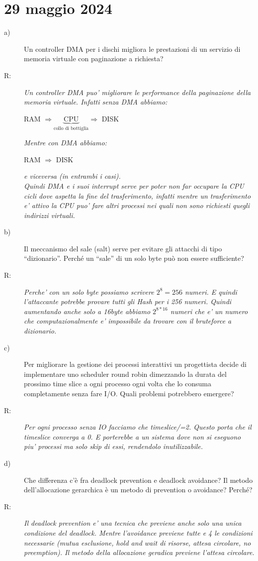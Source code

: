 \documentclass[a4paper,12pt]{article}
\newcommand{\datasection}[1]{%
    \section*{#1}%
    \addcontentsline{toc}{section}{#1}%
}
\newenvironment{exambox}{%
    \begin{mdframed}[
        linecolor=black!70,
        linewidth=0.6pt,
        innerleftmargin=8pt,
        innerrightmargin=8pt,
        innertopmargin=6pt,
        innerbottommargin=6pt
    ]
    \begin{description}
}{%
    \end{description}
    \end{mdframed}
}
\begin{document}
\newpage
\datasection{29 maggio 2024}
\begin{exambox}
\item[a)] Un controller DMA per i dischi migliora le prestazioni di un servizio di memoria virtuale con paginazione a richiesta?
\item[R:] \textit{Un controller DMA puo' migliorare le performance della paginazione della memoria virtuale. Infatti senza DMA abbiamo:}
\begin{center}
    RAM $\Rightarrow \underbrace{\text{CPU}}_\text{collo di bottiglia} \Rightarrow $ DISK
\end{center}
\textit{Mentre con DMA abbiamo:}
\begin{center}
    RAM $\Rightarrow$ DISK
\end{center}
\textit{e viceversa (in entrambi i casi).\\
Quindi DMA e i suoi interrupt serve per poter non far occupare la CPU cicli dove aspetta la fine del trasferimento, infatti mentre un trasferimento e' attivo la CPU puo' fare altri processi nei quali non sono richiesti quegli indirizzi virtuali.}
\item[b)] Il meccanismo del sale (salt) serve per evitare gli attacchi di tipo ``dizionario''. Perché un ``sale'' di un solo byte può non essere sufficiente?
\item[R:] \textit{Perche' con un solo byte possiamo scrivere $2^8=256$ numeri. E quindi l'attaccante potrebbe provare tutti gli Hash per i 256 numeri. Quindi aumentando anche solo a 16byte abbiamo $2^{8*16}$ numeri che e' un numero che computazionalmente e' impossibile da trovare con il bruteforce a dizionario.}
\item[c)] Per migliorare la gestione dei processi interattivi un progettista decide di implementare uno scheduler round robin dimezzando la durata del prossimo time slice a ogni processo ogni volta che lo consuma completamente senza fare I/O. Quali problemi potrebbero emergere?
\item[R:] \textit{Per ogni processo senza IO facciamo che timeslice/=2. Questo porta che il timeslice converga a 0. E porterebbe a un sistema dove non si eseguono piu' processi ma solo skip di essi, rendendolo inutilizzabile.}
\item[d)] Che differenza c'è fra deadlock prevention e deadlock avoidance? Il metodo dell'allocazione gerarchica è un metodo di prevention o avoidance? Perché?
\item[R:] \textit{Il deadlock prevention e' una tecnica che previene anche solo una unica condizione del deadlock. Mentre l'avoidance previene tutte e 4 le condizioni necessarie (mutua esclusione, hold and wait di risorse, attesa circolare, no preemption). Il metodo della allocazione geradica previene l'attesa circolare.}
\end{exambox}
\end{document}
